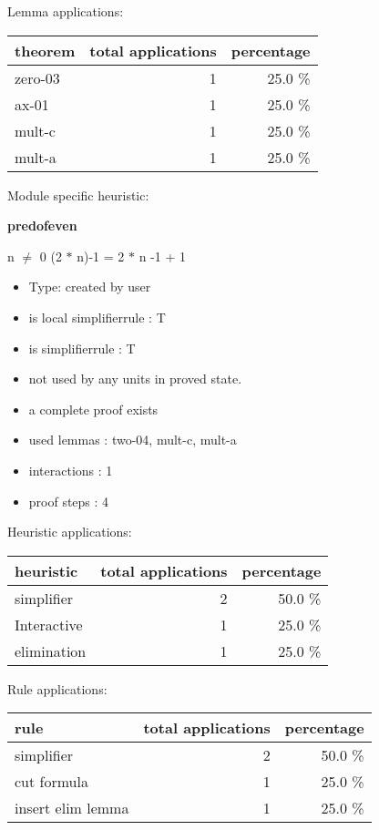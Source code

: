 \documentclass[a4paper]{article}
\begin{document}
Lemma applications:

\begin{supertabular}{l|r|r}
theorem	        & total applications & percentage \\ \hline
zero-03 & 1 & 25.0 \% \\
ax-01 & 1 & 25.0 \% \\
mult-c & 1 & 25.0 \% \\
mult-a & 1 & 25.0 \% \\

\end{supertabular}

Module specific heuristic:

\pagebreak

{\LARGE\bf predofeven}\label{lemma-predofeven}

\medskip

n $\neq$ 0 \Fol (2 $*$ n)-1 = 2 $*$ n -1 + 1

\begin{itemize}

\item Type: created by user

\item is local simplifierrule : T
\item is simplifierrule : T
\item not used by any units in proved state.
\item       a complete proof exists
\item       used lemmas  : two-04, mult-c, mult-a
\item       interactions : 1
\item       proof steps  : 4
\end{itemize}

\medskip


Heuristic applications:

\begin{supertabular}{l|r|r}
heuristic	& total applications & percentage \\ \hline
simplifier & 2 & 50.0 \% \\
Interactive & 1 & 25.0 \% \\
elimination & 1 & 25.0 \% \\

\end{supertabular}

Rule applications:

\begin{supertabular}{l|r|r}
rule	        & total applications & percentage \\ \hline
simplifier & 2 & 50.0 \% \\
cut formula & 1 & 25.0 \% \\
insert elim lemma & 1 & 25.0 \% \\

\end{supertabular}
\end{document}
